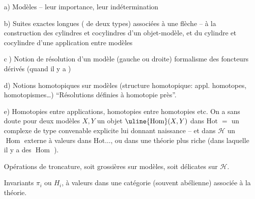 \margin{$\{$}
a) Modèles -- leur importance, leur indétermination

b) Suites exactes longues ( de deux types) associées
à une flèche --  à la construction des cylindres
 et cocylindres d'un objet-modèle, et du cylindre
et cocylindre d'une application entre modèles

\textcircled{c)} Notion de résolution d'un modèle (gauche ou droite)
formalisme des foncteurs dérivés (quand il y a
)

d) Notions homotopiques sur modèles (structure
homotopique: appl. homotopes, homotopismes\ldots)
``Résolutions définies à homotopie près''.

e) Homotopies entre applications, homotopies entre
homotopies etc. On a sans doute
 pour deux modèles
$X,Y$ un objet $\uline{\operatorname{Hom}}(X,Y)$ dans $\mathrm{Hot}$
 $=$ un complexe  de type convenable
explicite lui donnant naissance
-- et dans $\mathcal H$ un $\operatorname{Hom}$ externe à valeurs dans
$\mathrm{Hot}\ldots$, ou dans une théorie plus riche
(dans laquelle il y a des $\operatorname{Hom}$ ).

 Opérations de troncature, soit grossières
sur modèles, soit délicates sur $\mathcal H$.

 Invariants $\pi_i$ ou $H_i$, à valeurs dans
une catégorie (souvent abélienne) associée
à la théorie.
